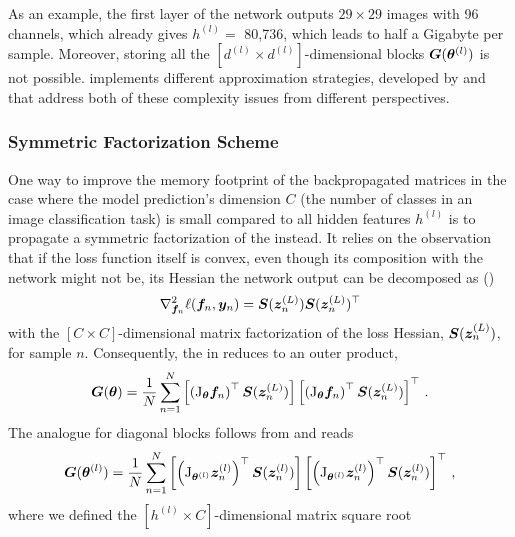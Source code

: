 As an example, the first layer of the \ALLCNNC network outputs $29 \times 29$
images with 96 channels, which already gives $h^{(l)} = $ 80,736, which leads to
half a Gigabyte per sample. Moreover, storing all the $[d^{(l)} \times
d^{(l)}]$-dimensional blocks ${\bm{G}}({\bm{\theta}}^{(l)})$ is not possible. \BackPACK
implements different approximation strategies, developed by
\citet{martens2015optimizing} and \citet{botev2017practical} that address both
of these complexity issues from different perspectives.

\subsubsection{Symmetric Factorization Scheme}

One way to improve the memory footprint of the backpropagated matrices in the
case where the model prediction's dimension $C$ (the number of classes in an
image classification task) is small compared to all hidden features $h^{(l)}$ is
to propagate a symmetric factorization of the \GGN instead. It relies on the
observation that if the loss function itself is convex, even though its
composition with the network might not be, its Hessian \wrt the network output
can be decomposed as (\eg {})
\begin{align}
  \nabla_{{\bm{f}}_n}^2 \ell({\bm{f}}_n, {\bm{y}}_n)
  = {\bm{S}}({\bm{z}}^{(L)}_n) {\bm{S}}({\bm{z}}^{(L)}_n)^\top
  \label{backpack::equ:loss_hessian_sqrt}
\end{align}
with the $[C\times C]$-dimensional matrix factorization of the loss Hessian,
${\bm{S}}({\bm{z}}^{(L)}_n)$, for sample $n$. Consequently, the \GGN in
 reduces to an outer product,
\begin{align}
  {\bm{G}}({\bm{\theta}})
  =
  \dfrac{1}{N}
  \sum_{n=1}^N
  \left[\left(\mathrm{J}_{{\bm{\theta}}} {\bm{f}}_n\right)^\top {\bm{S}}({\bm{z}}^{(L)}_n)\right]
  \left[\left(\mathrm{J}_{{\bm{\theta}}} {\bm{f}}_n\right)^\top {\bm{S}}({\bm{z}}^{(L)}_n)\right]^\top\,{.}
\end{align}
The analogue for diagonal blocks follows from
 and reads
\begin{align}
  {\bm{G}}({\bm{\theta}}^{(l)})
  =
  \dfrac{1}{N}
  \sum_{n=1}^N
  \left[\left(\mathrm{J}_{{\bm{\theta}}^{(l)}} {\bm{z}}^{(l)}_n\right)^\top {\bm{S}}({\bm{z}}^{(l)}_n) \right]
  \left[\left(\mathrm{J}_{{\bm{\theta}}^{(l)}} {\bm{z}}^{(l)}_n\right)^\top {\bm{S}}({\bm{z}}^{(l)}_n) \right]^\top\,{,}
  \label{backpack::equ:block_gauss_newton_sqrt}
\end{align}
where we defined the $[h^{(l)}\times C]$-dimensional matrix square root

